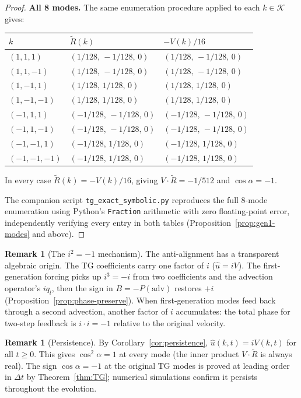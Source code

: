 \documentclass[11pt]{article}
\theoremstyle{definition}
\newtheorem{remark}[theorem]{Remark}
\newcommand{\cK}{\mathcal{K}}
\begin{document}
\begin{proof}
\smallskip\noindent\textbf{All 8 modes.}
The same enumeration procedure applied to each
$k\in\cK$ gives:
\begin{center}
\begin{tabular}{@{}lll@{}}
\toprule
$k$ & $\widetilde R(k)$ & $-V(k)/16$ \\
\midrule
$(1,1,1)$    & $(1/128,\,-1/128,\,0)$ & $(1/128,\,-1/128,\,0)$ \\
$(1,1,-1)$   & $(1/128,\,-1/128,\,0)$ & $(1/128,\,-1/128,\,0)$ \\
$(1,-1,1)$   & $(1/128,\,1/128,\,0)$  & $(1/128,\,1/128,\,0)$  \\
$(1,-1,-1)$  & $(1/128,\,1/128,\,0)$  & $(1/128,\,1/128,\,0)$  \\
$(-1,1,1)$   & $(-1/128,\,-1/128,\,0)$ & $(-1/128,\,-1/128,\,0)$ \\
$(-1,1,-1)$  & $(-1/128,\,-1/128,\,0)$ & $(-1/128,\,-1/128,\,0)$ \\
$(-1,-1,1)$  & $(-1/128,\,1/128,\,0)$ & $(-1/128,\,1/128,\,0)$ \\
$(-1,-1,-1)$ & $(-1/128,\,1/128,\,0)$ & $(-1/128,\,1/128,\,0)$ \\
\bottomrule
\end{tabular}
\end{center}
In every case $\widetilde R(k)=-V(k)/16$, giving
$V\cdot\widetilde R = -1/512$ and $\cos\alpha=-1$.

The companion script \texttt{tg\_exact\_symbolic.py}
reproduces the full 8-mode enumeration using Python's
\texttt{Fraction} arithmetic with zero floating-point
error, independently verifying every entry in both
tables (Proposition~\ref{prop:gen1-modes} and above).
\end{proof}

\begin{remark}[The $i^2=-1$ mechanism]
\label{rem:i-squared}
The anti-alignment has a transparent algebraic origin.
The TG coefficients carry one factor of $i$
($\hat u = iV$).  The first-generation forcing picks up
$i^3 = -i$ from two coefficients and the advection
operator's $iq_l$, then the sign in $B=-P(\text{adv})$
restores $+i$ (Proposition~\ref{prop:phase-preserve}).
When first-generation modes feed back through a second
advection, another factor of $i$ accumulates: the total
phase for two-step feedback is $i\cdot i = -1$ relative
to the original velocity.
\end{remark}

\begin{remark}[Persistence]
By Corollary~\ref{cor:persistence}, $\hat u(k,t) = iV(k,t)$
for all $t\geq 0$.  This gives $\cos^2\alpha = 1$ at
every mode (the inner product $V\cdot\widetilde R$ is
always real).  The sign $\cos\alpha = -1$ at the original
TG modes is proved at leading order in $\Delta t$ by
Theorem~\ref{thm:TG}; numerical simulations confirm it
persists throughout the evolution.
\end{remark}
\end{document}
